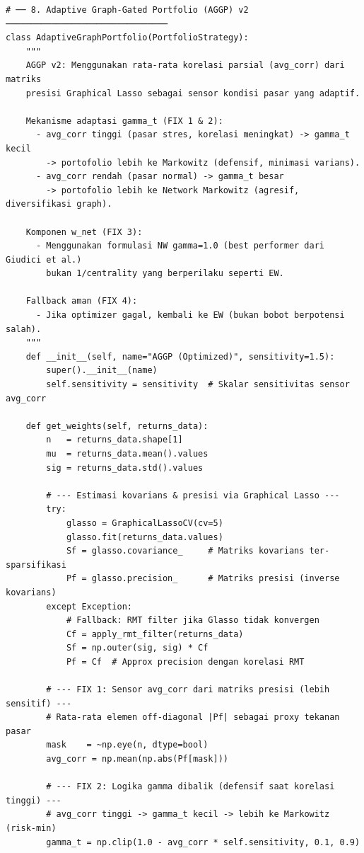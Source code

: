 \documentclass[12pt,a4paper]{article}
\begin{document}
\begin{lstlisting}[caption={Kelas-kelas strategi portofolio (AGGP v2 -- 4 Fixes Applied)}]
# ── 8. Adaptive Graph-Gated Portfolio (AGGP) v2 ────────────────────────────────
class AdaptiveGraphPortfolio(PortfolioStrategy):
    """
    AGGP v2: Menggunakan rata-rata korelasi parsial (avg_corr) dari matriks
    presisi Graphical Lasso sebagai sensor kondisi pasar yang adaptif.

    Mekanisme adaptasi gamma_t (FIX 1 & 2):
      - avg_corr tinggi (pasar stres, korelasi meningkat) -> gamma_t kecil
        -> portofolio lebih ke Markowitz (defensif, minimasi varians).
      - avg_corr rendah (pasar normal) -> gamma_t besar
        -> portofolio lebih ke Network Markowitz (agresif, diversifikasi graph).

    Komponen w_net (FIX 3):
      - Menggunakan formulasi NW gamma=1.0 (best performer dari Giudici et al.)
        bukan 1/centrality yang berperilaku seperti EW.

    Fallback aman (FIX 4):
      - Jika optimizer gagal, kembali ke EW (bukan bobot berpotensi salah).
    """
    def __init__(self, name="AGGP (Optimized)", sensitivity=1.5):
        super().__init__(name)
        self.sensitivity = sensitivity  # Skalar sensitivitas sensor avg_corr

    def get_weights(self, returns_data):
        n   = returns_data.shape[1]
        mu  = returns_data.mean().values
        sig = returns_data.std().values

        # --- Estimasi kovarians & presisi via Graphical Lasso ---
        try:
            glasso = GraphicalLassoCV(cv=5)
            glasso.fit(returns_data.values)
            Sf = glasso.covariance_     # Matriks kovarians ter-sparsifikasi
            Pf = glasso.precision_      # Matriks presisi (inverse kovarians)
        except Exception:
            # Fallback: RMT filter jika Glasso tidak konvergen
            Cf = apply_rmt_filter(returns_data)
            Sf = np.outer(sig, sig) * Cf
            Pf = Cf  # Approx precision dengan korelasi RMT

        # --- FIX 1: Sensor avg_corr dari matriks presisi (lebih sensitif) ---
        # Rata-rata elemen off-diagonal |Pf| sebagai proxy tekanan pasar
        mask    = ~np.eye(n, dtype=bool)
        avg_corr = np.mean(np.abs(Pf[mask]))

        # --- FIX 2: Logika gamma dibalik (defensif saat korelasi tinggi) ---
        # avg_corr tinggi -> gamma_t kecil -> lebih ke Markowitz (risk-min)
        gamma_t = np.clip(1.0 - avg_corr * self.sensitivity, 0.1, 0.9)


\end{lstlisting}
\end{document}
